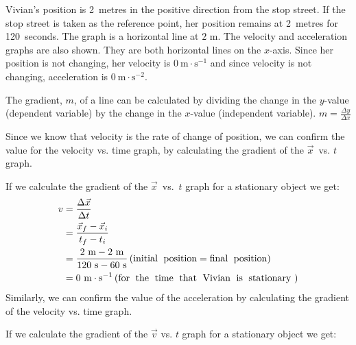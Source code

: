 Vivian's position is 2~metres in the positive direction from the stop street. If the stop street is taken as the reference point, her position remains at 2~metres for 120~seconds. The graph is a horizontal line at $2 \text{ m}$.
The velocity and acceleration graphs are also shown. They are both horizontal lines on the $x$-axis. Since her position is not changing, her velocity is $0~\text{m}\ensuremath{\cdot}\text{s}{}^{-1}$ and since velocity is not changing, acceleration is $0~\text{m}\ensuremath{\cdot}\text{s}{}^{-2}$.
 {The gradient, $m$, of a line can be calculated by dividing the change in the $y$-value (dependent variable) by the change in the $x$-value (independent variable). $m = \frac{\Delta y}{\Delta x}$ \par  } 
        \label{m38795*id69281}Since we know that velocity is the rate of change of position, we can confirm the value for the velocity vs. time graph, by calculating the gradient of the $\vec{x}$~vs. $t$ graph.\par 
\label{m38795*notfhsst!!!underscore!!!id1870}
	\par	
        \label{m38795*id69310}If we calculate the gradient of the $\vec{x}$~vs.~$t$ graph for a stationary object we get:
    \begin{align*}
	v &= \frac{\Delta \vec{x}}{\Delta t}\\
	&= \frac{\vec{x}_{f}-\vec{x}_{i}}{{t}_{f}-{t}_{i}}\\
	&= \frac{2~\text{m}-2~\text{m}}{120~\text{s}-60~\text{s}} \left(\text{initial\; position}=\text{final\; position}\right)\\ 
	&= 0~\text{m}\ensuremath{\cdot}{\text{s}}^{-1}  \left(\text{for\; the\; time\; that\; Vivian\; is\; stationary}~\right) \\
      \end{align*}
        \label{m38795*id69558}Similarly, we can confirm the value of the acceleration by calculating the gradient of the velocity vs. time graph.\par 
\label{m38795*notfhsst!!!underscore!!!id2005}
	\par
        \label{m38795*id69571}If we calculate the gradient of the $\vec{v}$ vs. $t$ graph for a stationary object we get:
          
